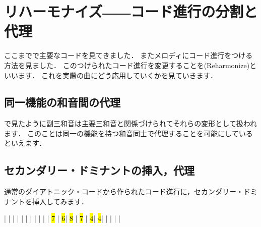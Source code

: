 \documentclass[dvipdfmx,uplatex,b5paper,openany,jbase=12Q,nomag*,textwidth-limit=44%
               ]{gachimuchi}[2020/05/05]
\begin{document}
\chapter{リハーモナイズ――コード進行の分割と代理}
ここまでで主要なコードを見てきました．
またメロディにコード進行をつける方法を見ました．
このつけられたコード進行を変更することを\xkanjispace(Reharmonize)といいます．
これを実際の曲にどう応用していくかを見ていきます．

\section{同一機能の和音間の代理}
で見たように副三和音は主要三和音と関係づけられてそれらの変形として扱われます．
このことは同一の機能を持つ和音同士で代理することを可能にしているといえます．

\section{セカンダリー・ドミナントの挿入，代理}
通常のダイアトニック・コードから作られたコード進行に，セカンダリー・ドミナントを挿入してみます．

\begin{Music}
  \generalmeter{\meterC}%
  \Startpiece%
  \NOTEs%
  |%
  \en%
  \bar%
  \NOTEs%
  |%
  \en%
  \bar%
  \NOTEs%
  |%
  \en%
  \bar%
  \NOTEs%
  |%
  \en%
  \bar%
  \NOTEs%
  |%
  \en%
  \setdoubleBAR\endpiece
  \generalmeter{\meterC}%
  \Startpiece%
  \NOTes%
  |%
  \en%
  \NOTes%
  |%
  \hl{7}\en%
  \bar%
  \NOTes%
  \hl{6}|%
  \hl{8}\en%
  \NOTes%
  |%
  \hl{7}\en%
  \bar%
  \NOTes%
  \hl{4}|%
  \en%
  \NOTes%
  \hl{4}|%
  \en%
  \bar%
  \NOTEs%
  |%
  \en%
  \bar%
  \NOTEs%
  |%
  \en%
  \setdoubleBAR\endpiece
\end{Music}
\end{document}
